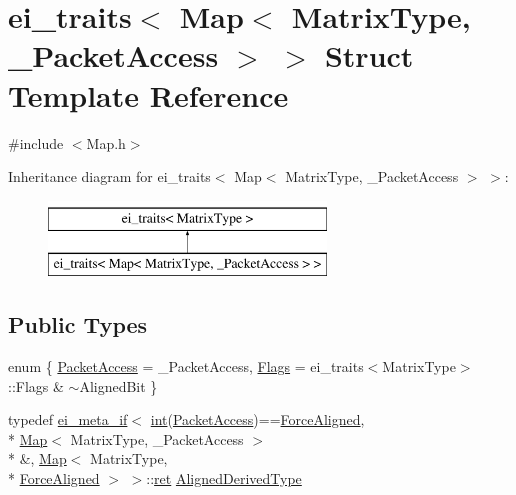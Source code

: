 \hypertarget{structei__traits_3_01_map_3_01_matrix_type_00_01___packet_access_01_4_01_4}{\section{ei\-\_\-traits$<$ Map$<$ Matrix\-Type, \-\_\-\-Packet\-Access $>$ $>$ Struct Template Reference}
\label{structei__traits_3_01_map_3_01_matrix_type_00_01___packet_access_01_4_01_4}
}


{\ttfamily \#include $<$Map.\-h$>$}

Inheritance diagram for ei\-\_\-traits$<$ Map$<$ Matrix\-Type, \-\_\-\-Packet\-Access $>$ $>$\-:\begin{figure}[H]
\begin{center}
\leavevmode
\includegraphics[height=2.000000cm]{structei__traits_3_01_map_3_01_matrix_type_00_01___packet_access_01_4_01_4}
\end{center}
\end{figure}
\subsection*{Public Types}
\begin{DoxyCompactItemize}
\item 
enum \{ \hyperlink{structei__traits_3_01_map_3_01_matrix_type_00_01___packet_access_01_4_01_4_abee841e9dad7dd5f092b7e1add5e4043a34ca7ebae04de5da9cb1bfaa691756a8}{Packet\-Access} = \-\_\-\-Packet\-Access, 
\hyperlink{structei__traits_3_01_map_3_01_matrix_type_00_01___packet_access_01_4_01_4_abee841e9dad7dd5f092b7e1add5e4043a26757cd1e613540225266b43c85effe2}{Flags} = ei\-\_\-traits$<$Matrix\-Type$>$\-:\-:Flags \& $\sim$\-Aligned\-Bit
 \}
\item 
typedef \hyperlink{structei__meta__if}{ei\-\_\-meta\-\_\-if}$<$ \hyperlink{ioapi_8h_a787fa3cf048117ba7123753c1e74fcd6}{int}(\hyperlink{structei__traits_3_01_map_3_01_matrix_type_00_01___packet_access_01_4_01_4_abee841e9dad7dd5f092b7e1add5e4043a34ca7ebae04de5da9cb1bfaa691756a8}{Packet\-Access})==\hyperlink{_constants_8h_a1812ab31015cef0a41c6d4f3ae07f13da0a764e01b4d9a74a89d6da025ec4b673}{Force\-Aligned}, \\*
\hyperlink{class_map}{Map}$<$ Matrix\-Type, \-\_\-\-Packet\-Access $>$\\*
 \&, \hyperlink{class_map}{Map}$<$ Matrix\-Type, \\*
\hyperlink{_constants_8h_a1812ab31015cef0a41c6d4f3ae07f13da0a764e01b4d9a74a89d6da025ec4b673}{Force\-Aligned} $>$ $>$\-::\hyperlink{group___i_p_conn_plugin_gabc99fe6afec1a75ccff1092e47375a40}{ret} \hyperlink{structei__traits_3_01_map_3_01_matrix_type_00_01___packet_access_01_4_01_4_a026226ef5e2790d810a275ebeca62880}{Aligned\-Derived\-Type}
\end{DoxyCompactItemize}


